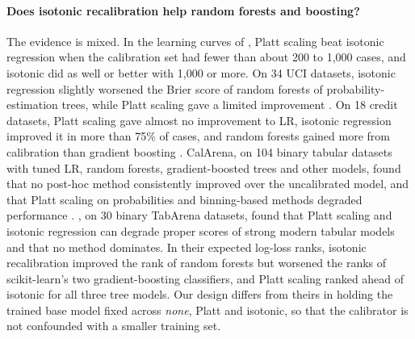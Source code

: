 \documentclass[11pt]{article}
\begin{document}
\paragraph{Does isotonic recalibration help random forests and boosting?} The evidence is
mixed. In the learning curves of \citet{niculescumizil2005}, Platt scaling beat isotonic
regression when the calibration set had fewer than about 200 to 1,000 cases, and isotonic did
as well or better with 1,000 or more. On 34 UCI datasets, isotonic regression slightly
worsened the Brier score of random forests of probability-estimation trees, while Platt
scaling gave a limited improvement \citep{bostrom2008}. On 18 credit datasets, Platt scaling
gave almost no improvement to LR, isotonic regression improved it in more than 75\% of cases,
and random forests gained more from calibration than gradient boosting \citep{fonseca2017}.
CalArena, on 104 binary tabular datasets with tuned LR, random forests, gradient-boosted trees
and other models, found that no post-hoc method consistently improved over the uncalibrated
model, and that Platt scaling on probabilities and binning-based methods degraded performance
\citep{berta2026}. \citet{manokhin2026}, on 30 binary TabArena datasets, found that Platt
scaling and isotonic regression can degrade proper scores of strong modern tabular models and
that no method dominates. In their expected log-loss ranks, isotonic recalibration improved
the rank of random forests but worsened the ranks of scikit-learn's two gradient-boosting
classifiers, and Platt scaling ranked ahead of isotonic for all three tree models. Our design differs from theirs in
holding the trained base model fixed across \emph{none}, Platt and isotonic, so that the
calibrator is not confounded with a smaller training set.
\end{document}
